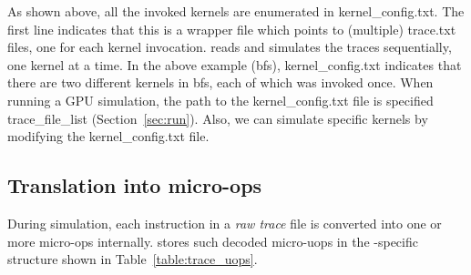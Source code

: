 As shown above, all the invoked kernels are enumerated in kernel\_config.txt.
The first line indicates that this is a wrapper file which points to (multiple)
trace.txt files, one for each kernel invocation. \SIM reads and simulates the
traces sequentially, one kernel at a time.  In the above example (bfs),
kernel\_config.txt indicates that there are two different kernels in bfs,
each of which was invoked once. When running a GPU simulation, the path to
the kernel\_config.txt file is specified trace\_file\_list
(Section~\ref{sec:run}).  Also, we can simulate specific kernels
by modifying the kernel\_config.txt file.

\subsection{Translation into micro-ops}

During simulation, each instruction in a \emph{raw trace} file is
converted into one or more micro-ops internally. \SIM stores such
decoded micro-uops in the \SIM-specific structure shown in
Table~\ref{table:trace_uops}.

